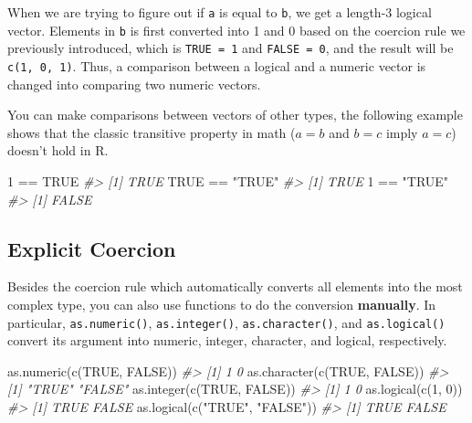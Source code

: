 \documentclass[
]{book}
\newenvironment{Shaded}{\begin{snugshade}}{\end{snugshade}}
\newcommand{\CommentTok}[1]{\textcolor[rgb]{0.56,0.35,0.01}{\textit{#1}}}
\newcommand{\ConstantTok}[1]{\textcolor[rgb]{0.00,0.00,0.00}{#1}}
\newcommand{\DecValTok}[1]{\textcolor[rgb]{0.00,0.00,0.81}{#1}}
\newcommand{\FunctionTok}[1]{\textcolor[rgb]{0.00,0.00,0.00}{#1}}
\newcommand{\NormalTok}[1]{#1}
\newcommand{\SpecialCharTok}[1]{\textcolor[rgb]{0.00,0.00,0.00}{#1}}
\newcommand{\StringTok}[1]{\textcolor[rgb]{0.31,0.60,0.02}{#1}}
\begin{document}
When we are trying to figure out if \texttt{a} is equal to \texttt{b}, we get a length-3 logical vector. Elements in \texttt{b} is first converted into 1 and 0 based on the coercion rule we previously introduced, which is \texttt{TRUE\ =\ 1} and \texttt{FALSE\ =\ 0}, and the result will be \texttt{c(1,\ 0,\ 1)}. Thus, a comparison between a logical and a numeric vector is changed into comparing two numeric vectors.

You can make comparisons between vectors of other types, the following example shows that the classic transitive property in math (\(a = b\) and \(b = c\) imply \(a = c\)) doesn't hold in R.

\begin{Shaded}
\begin{Highlighting}[]
\DecValTok{1} \SpecialCharTok{==} \ConstantTok{TRUE}
\CommentTok{\#\textgreater{} [1] TRUE}
\ConstantTok{TRUE} \SpecialCharTok{==} \StringTok{"TRUE"}   
\CommentTok{\#\textgreater{} [1] TRUE}
\DecValTok{1} \SpecialCharTok{==} \StringTok{"TRUE"}
\CommentTok{\#\textgreater{} [1] FALSE}
\end{Highlighting}
\end{Shaded}

\hypertarget{explicit-coercion}{%
\subsection{Explicit Coercion}\label{explicit-coercion}}

Besides the coercion rule which automatically converts all elements into the most complex type, you can also use functions to do the conversion \textbf{manually}. In particular,
\texttt{as.numeric()}, \texttt{as.integer()}, \texttt{as.character()}, and \texttt{as.logical()} convert its argument into numeric, integer, character, and logical, respectively.

\begin{Shaded}
\begin{Highlighting}[]
\FunctionTok{as.numeric}\NormalTok{(}\FunctionTok{c}\NormalTok{(}\ConstantTok{TRUE}\NormalTok{, }\ConstantTok{FALSE}\NormalTok{))}
\CommentTok{\#\textgreater{} [1] 1 0}
\FunctionTok{as.character}\NormalTok{(}\FunctionTok{c}\NormalTok{(}\ConstantTok{TRUE}\NormalTok{, }\ConstantTok{FALSE}\NormalTok{))}
\CommentTok{\#\textgreater{} [1] "TRUE"  "FALSE"}
\FunctionTok{as.integer}\NormalTok{(}\FunctionTok{c}\NormalTok{(}\ConstantTok{TRUE}\NormalTok{, }\ConstantTok{FALSE}\NormalTok{))}
\CommentTok{\#\textgreater{} [1] 1 0}
\FunctionTok{as.logical}\NormalTok{(}\FunctionTok{c}\NormalTok{(}\DecValTok{1}\NormalTok{, }\DecValTok{0}\NormalTok{))}
\CommentTok{\#\textgreater{} [1]  TRUE FALSE}
\FunctionTok{as.logical}\NormalTok{(}\FunctionTok{c}\NormalTok{(}\StringTok{"TRUE"}\NormalTok{, }\StringTok{"FALSE"}\NormalTok{))}
\CommentTok{\#\textgreater{} [1]  TRUE FALSE}
\end{Highlighting}
\end{Shaded}
\end{document}
